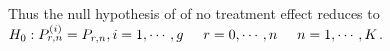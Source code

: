 \documentclass[12pt,oneside]{report}
\theoremstyle{definition}
\theoremstyle{mystyle}
\begin{document}


Thus  the  null hypothesis of of no treatment effect reduces to $H_{0}:P^{(i)}_{r,n}=P_{r,n},i=1,\cdots,g \hspace{5mm}r=0,\cdots,n \hspace{5mm} n=1,\cdots,K$.

%
%
\end{document}
